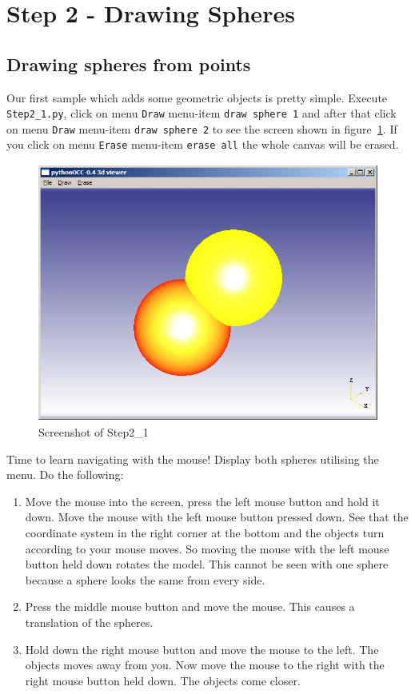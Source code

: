 \section{Step 2 - Drawing Spheres}
\subsection{Drawing spheres from points}
Our first sample which adds some geometric objects is pretty simple.
Execute {\tt Step2\_1.py}, click on menu {\tt Draw} menu-item  {\tt draw sphere 1} and after that click on menu {\tt Draw} menu-item  {\tt draw sphere 2} to see the screen shown in figure~\ref{STEP_2_1_SCREEN}.
If you click on menu {\tt Erase} menu-item  {\tt erase all} the whole canvas will be erased.
\begin{figure}[h]
\begin{center}
\includegraphics[height=8.5cm,width=11.3cm]{Step2_1.jpg}
\end{center}
\caption[Screenshot of Step2\_1]{\label{STEP_2_1_SCREEN}Screenshot of Step2\_1}
\end{figure}

Time to learn navigating with the mouse!
Display both spheres utilising the menu.
Do the following:
\begin{enumerate}
\item Move the mouse into the screen, press the left mouse button and hold it
		down.
		Move the mouse with the left mouse button pressed down.
		See that the coordinate system in the right corner at the bottom and the
		objects turn according to your mouse moves.
		So moving the mouse with the left mouse button held down rotates the 
		model.
		This cannot be seen with one sphere because a sphere looks the same from
		every side. 
\item Press the middle mouse button and move the mouse. 
		This causes a translation of the spheres.
\item Hold down the right mouse button and move the mouse to the left.
		The objects moves away from you.
		Now move the mouse to the right with the right mouse button held down.
		The objects come closer.
\end{enumerate}

